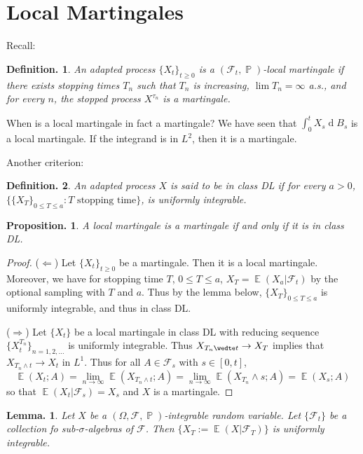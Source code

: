 \documentclass[11pt, a4paper]{memoir}
\newcommand{\impr}{{($\Longrightarrow$)\hspace{0.2cm}}}
\newcommand{\impl}{{($\Longleftarrow$)\hspace{0.2cm}}}
\theoremstyle{change}
\newtheorem{lemma}[theorem]{Lemma.}
\newtheorem{proposition}[theorem]{Proposition.}
\theoremstyle{plain}
\theoremstyle{nonumberplain}
\newtheorem{definition}{Definition.}
\newtheorem{proof}{Proof}
\DeclareMathOperator{\pr}{{\mathbb{P}}}
\DeclareMathOperator{\E}{{\mathbb{E}}}
\renewcommand{\d}[1]{\ensuremath{\operatorname{d}\!{#1}}}
\numberwithin{equation}{section}
\begin{document}
\section{Local Martingales}
Recall:
\begin{definition}
    An adapted process $\{X_t\}_{t\geq 0}$ is a $(\mathcal{F}_t,\pr)$-local martingale if there exists stopping times $T_n$ such that $T_n$ is increasing, $\lim T_n=\infty$ a.s., and for every $n$, the stopped process $X^{\tau_n}$ is a martingale.
\end{definition}
When is a local martingale in fact a martingale?
We have seen that $\int_0^t X_s\d{B_s}$ is a local martingale.
If the integrand is in $L^2$, then it is a martingale.

Another criterion:
\begin{definition}
    An adapted process $X$ is said to be in class DL if for every $a>0$, $\bigl\{\{X_T\}_{0\leq T\leq a}:T\text{ stopping time}\bigr\}$, is uniformly integrable.
\end{definition}
\begin{proposition}
    A local martingale is a martingale if and only if it is in class DL.
\end{proposition}
\begin{proof}
    \impl
    Let $\{X_t\}_{t\geq 0}$ be a martingale.
    Then it is a local martingale.
    Moreover, we have for stopping time $T$, $0\leq T\leq a$, $X_T=\E(X_a|\mathcal{F}_t)$ by the optional sampling with $T$ and $a$.
    Thus by the lemma below, $\{X_T\}_{0\leq T\leq a}$ is uniformly integrable, and thus in class DL.

    \impr
    Let $\{X_t\}$ be a local martingale in class DL with reducing sequence $\{X_t^{T_n}\}_{n=1,2,\ldots}$ is uniformly integrable.
    Thus $X_{T_n\wedte t}\to X_T$ implies that $X_{T_n\wedge t}\to X_t$ in $L^1$.
    Thus for all $A\in\mathcal{F}_s$ with $s\in[0,t]$,
    \begin{equation*}
        \E(X_t;A)=\lim_{n\to\infty}\E(X_{T_n\wedge t};A)=\lim_{n\to\infty}\E(X_{T_n}\wedge s;A)=\E(X_s;A)
    \end{equation*}
    so that $\E(X_t|\mathcal{F}_s)=X_s$ and $X$ is a martingale.
\end{proof}
\begin{lemma}
    Let $X$ be a $(\Omega,\mathcal{F},\pr)$-integrable random variable.
    Let $\{\mathcal{F}_t\}$ be a collection fo sub-$\sigma$-algebras of $\mathcal{F}$.
    Then $\{X_T:=\E(X|\mathcal{F}_T)\}$ is uniformly integrable.
\end{lemma}
\end{document}
